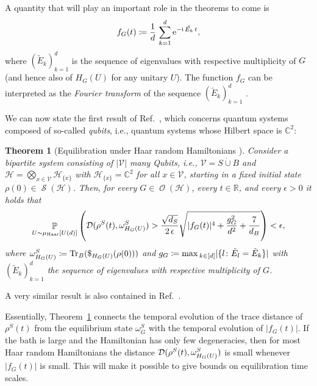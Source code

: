 \documentclass[a4paper,12pt,listof=totoc,index=totoc,bibliography=totoc,headsepline=false,headings=normal,BCOR16.153846mm,DIV12,headinclude,twoside,cleardoublepage=empty,numbers=noenddot,final]{scrreprt}
\theoremstyle{mystyle}
\numberwithin{equation}{section}
\numberwithin{figure}{section}
\numberwithin{lemma}{section}
\newtheorem{theorem}{Theorem}
\numberwithin{theorem}{section}
\numberwithin{corollary}{section}
\numberwithin{definition}{section}
\numberwithin{conjecture}{section}
\numberwithin{observation}{section}
\newcommand{\+}{\mkern2mu}
\newcommand{\coloneqq}{\mathrel{\vcentcolon\mkern-1.2mu=}} %
\newcommand{\dunion}{\mathbin{\dot{\cup}}}
\newcommand{\oftype}{\colon}
\renewcommand{\max}{\mathchoice{\operatorname*{max}}{\operatorname*{max}}{\mathrm{max}}{\mathrm{max}}} %
\renewcommand{\H}{H}
\newcommand{\muhaar}{\mu_{\mathrm{Haar}}}
\newcommand{\Vset}{\mathcal{V}}
\newcommand{\tracedistance}[3][]{
  \ifthenelse{\equal{#2}{}}
  {\ifthenelse{\equal{#3}{}}
    {\mathcal{D}_{#1}}{}
  }{
    \ifthenelse{\equal{#1}{}}
    {\operatorname{\mathcal{D}}(#2,#3)}
    {\operatorname{\mathcal{D}}_{#1}(#2,#3)}
  }
}
\DeclareMathOperator*{\probability}{\mathbb{P}}
\newcommand{\e}{\mathrm{e}}
\renewcommand{\i}{\mathrm{i}}
\DeclareMathOperator{\1}{\mathds{1}}
\DeclareMathOperator{\Obs}{\mathcal{O}}
\DeclareMathOperator{\Qst}{\mathcal{S}}
\DeclareMathOperator{\Tr}{Tr}
\newcommand{\mc}[1]{\mathcal{#1}}
\newcommand{\mcH}{\mc{H}}
\newcommand{\mb}[1]{\mathbb{#1}}
\newcommand{\R}{\mb{R}}
\renewcommand{\C}{\mb{C}} %
\begin{document}
A quantity that will play an important role in the theorems to come is 
\begin{equation} \label{eq:deffouriertransformedcpectrum}
  f_G(t) \coloneqq \frac{1}{d}\,\sum_{k=1}^d \e^{- \i\,\tilde{E_k}\,t} ,
\end{equation}
where $(\tilde E_k)_{k=1}^d$ is the sequence of eigenvalues with respective multiplicity of $G$ (and hence also of $\H_G(U)$ for any unitary $U$).
The function $f_G$ can be interpreted as the \emph{Fourier transform} of the sequence $(\tilde E_k)_{k=1}^d$ \cite{1108.0374}.

We can now state the first result of Ref.~\cite{1108.0374}, which concerns quantum systems composed of so-called \emph{qubits}, i.e., quantum systems whose Hilbert space is $\C^2$:
\begin{theorem}[Equilibration under Haar random Hamiltonians {\cite[Result~1]{1108.0374}}] \label{thm:equilibrationunderrandomhamiltonians}
  Consider a bipartite system consisting of $|\Vset|$ many Qubits, i.e., $\Vset = S \dunion B$ and $\mcH = \bigotimes_{x\in\Vset} \mcH_{\{x\}}$ with $\mcH_{\{x\}} = \C^2$ for all $x \in \Vset$, starting in a fixed initial state $\rho(0) \in \Qst(\mcH)$.
  Then, for every $G \in \Obs(\mcH)$, every $t \in \R$, and every $\epsilon > 0$ it holds that
  \begin{equation} \label{eq:equilibrationunderrandomhamiltonsbound}
    \probability_{U \sim \muhaar[U(d)]}\left( \tracedistance{\rho^S(t)}{\omega_{H_G(U)}^S} > \frac{\sqrt{d_S}}{2\,\epsilon} \sqrt{ |f_G(t)|^4 + \frac{g_G^2}{d^2} + \frac{7}{d_B} }\right) < \epsilon ,
  \end{equation}
  where $\omega_{H_G(U)}^S \coloneqq \Tr_B(\$_{\H_G(U)}(\rho(0)))$ and $g_G \coloneqq \max_{k\in[d]} |\{l\oftype \tilde E_l = \tilde E_k \}|$ with $(\tilde E_k)_{k=1}^d$ the sequence of eigenvalues with respective multiplicity of $G$.
\end{theorem}
A very similar result is also contained in Ref.~\cite{1108.2985v3}.

Essentially, Theorem~\ref{thm:equilibrationunderrandomhamiltonians} connects the temporal evolution of the trace distance of $\rho^S(t)$ from the equilibrium state $\omega^S_G$ with the temporal evolution of $|f_G(t)|$.
If the bath is large and the Hamiltonian has only few degeneracies, then for most Haar random Hamiltonians the distance $\tracedistance{\rho^S(t)}{\omega_{H_G(U)}^S}$ is small whenever $|f_G(t)|$ is small.
This will make it possible to give bounds on equilibration time scales.
\end{document}
